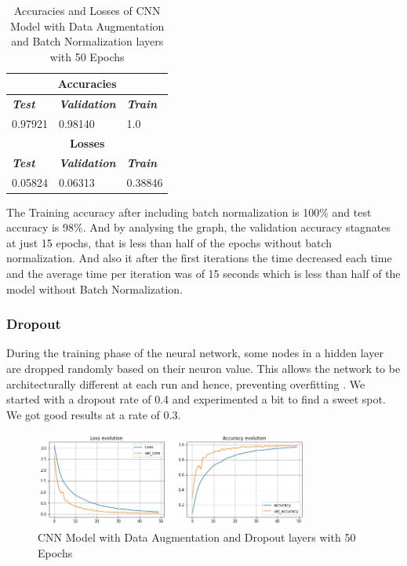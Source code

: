 \documentclass[conference]{IEEEtran}
\begin{document}
\begin{table}[htbp]
\caption{Accuracies and Losses of CNN Model with Data Augmentation and Batch Normalization layers with 50 Epochs}
\begin{center}
\begin{tabular}{|p{2cm}|p{2cm}|p{2cm}|}
\hline
\multicolumn{3}{|c|}{\textbf{Accuracies}} \\
\hline
\textbf{\textit{Test}}& \textbf{\textit{Validation}}& \textbf{\textit{Train}} \\
\hline
0.97921 & 0.98140 & 1.0 \\
\hline
\multicolumn{3}{|c|}{\textbf{Losses}} \\
\hline
\textbf{\textit{Test}}& \textbf{\textit{Validation}}& \textbf{\textit{Train}} \\
\hline
0.05824 & 0.06313 & 0.38846 \\
\hline
\end{tabular}
\end{center}
\end{table}


The Training accuracy after including batch normalization is 100\% and test accuracy is 98\%. And by analysing the graph, the validation accuracy stagnates at just 15 epochs, that is less than half of the epochs without batch normalization. And also it after the first iterations the time decreased each time and the average time per iteration was of 15 seconds which is less than half of the model without Batch Normalization.

\subsubsection{Dropout}

During the training phase of the neural network, some nodes in a hidden layer are dropped randomly based on their neuron value. This allows the network to be architecturally different at each run and hence, preventing overfitting \cite{medium_Jachak}. We started with a dropout rate of 0.4 and experimented a bit to find a sweet spot. We got good results at a rate of 0.3.

\begin{figure}[htbp]
    \centerline{\includegraphics[width=9cm]{img/final_model_drop_50ep.png}}
    \caption{CNN Model with Data Augmentation and Dropout layers with 50 Epochs}
    \label{fig:hist_train_classes}
\end{figure}
\end{document}
